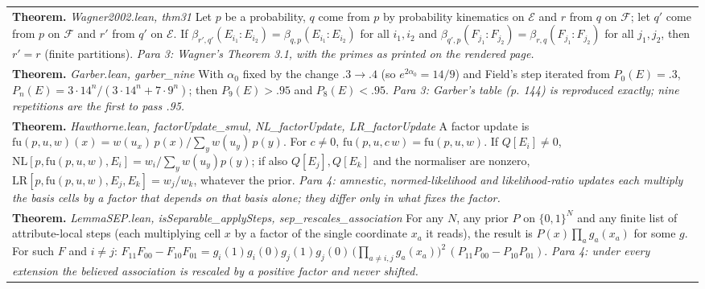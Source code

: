\documentclass[10pt]{article}
\theoremstyle{definition}
\newlength{\fullw}\setlength{\fullw}{25.9cm}
\begin{document}
{\begin{longtable}{|p{0.9cm}|p{12.2cm}|p{12.2cm}|}
\multicolumn{3}{|p{\fullw}|}{\textbf{Theorem.} \textit{Wagner2002.lean, thm31} \newline Let $p$ be a probability, $q$ come from $p$ by probability kinematics on $\mathcal{E}$ and $r$ from $q$ on $\mathcal{F}$; let $q'$ come from $p$ on $\mathcal{F}$ and $r'$ from $q'$ on $\mathcal{E}$. If $\beta_{r',q'}(E_{i_1}{:}E_{i_2}) = \beta_{q,p}(E_{i_1}{:}E_{i_2})$ for all $i_1, i_2$ and $\beta_{q',p}(F_{j_1}{:}F_{j_2}) = \beta_{r,q}(F_{j_1}{:}F_{j_2})$ for all $j_1, j_2$, then $r' = r$ (finite partitions). \newline \textit{Para 3: Wagner's Theorem 3.1, with the primes as printed on the rendered page.}} \\
\multicolumn{3}{|p{\fullw}|}{\textbf{Theorem.} \textit{Garber.lean, garber\_nine} \newline With $\alpha_0$ fixed by the change $.3 \to .4$ (so $e^{2\alpha_0} = 14/9$) and Field's step iterated from $P_0(E) = .3$, $P_n(E) = 3\cdot 14^n/(3\cdot 14^n + 7\cdot 9^n)$; then $P_9(E) > .95$ and $P_8(E) < .95$. \newline \textit{Para 3: Garber's table (p. 144) is reproduced exactly; nine repetitions are the first to pass .95.}} \\
\multicolumn{3}{|p{\fullw}|}{\textbf{Theorem.} \textit{Hawthorne.lean, factorUpdate\_smul, NL\_factorUpdate, LR\_factorUpdate} \newline A factor update is $\mathrm{fu}(p,u,w)(x) = w(u_x)\,p(x)\big/\sum_y w(u_y)\,p(y)$. For $c \neq 0$, $\mathrm{fu}(p,u,c\,w) = \mathrm{fu}(p,u,w)$. If $Q[E_i] \neq 0$, $\mathrm{NL}[p,\mathrm{fu}(p,u,w),E_i] = w_i/\sum_y w(u_y)p(y)$; if also $Q[E_j], Q[E_k]$ and the normaliser are nonzero, $\mathrm{LR}[p,\mathrm{fu}(p,u,w),E_j,E_k] = w_j/w_k$, whatever the prior. \newline \textit{Para 4: amnestic, normed-likelihood and likelihood-ratio updates each multiply the basis cells by a factor that depends on that basis alone; they differ only in what fixes the factor.}} \\
\multicolumn{3}{|p{\fullw}|}{\textbf{Theorem.} \textit{LemmaSEP.lean, isSeparable\_applySteps, sep\_rescales\_association} \newline For any $N$, any prior $P$ on $\{0,1\}^N$ and any finite list of attribute-local steps (each multiplying cell $x$ by a factor of the single coordinate $x_a$ it reads), the result is $P(x)\prod_a g_a(x_a)$ for some $g$. For such $F$ and $i \neq j$: $F_{11}F_{00} - F_{10}F_{01} = g_i(1)g_i(0)g_j(1)g_j(0)\,\big(\prod_{a \neq i,j} g_a(x_a)\big)^2\,(P_{11}P_{00} - P_{10}P_{01})$. \newline \textit{Para 4: under every extension the believed association is rescaled by a positive factor and never shifted.}} \\ \hline

\end{longtable}}
\end{document}
